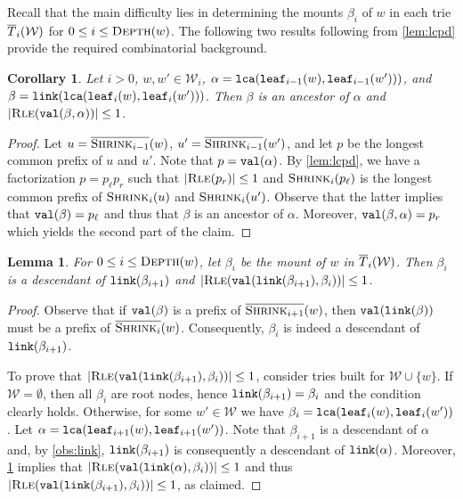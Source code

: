 \documentclass[a4paper]{article}
\newtheorem{lemma}[theorem]{Lemma}
\newtheorem{corollary}[theorem]{Corollary}
\theoremstyle{remark}
\newcommand{\depth}{\textsc{Depth}}
\newcommand{\rle}{\textsc{Rle}}
\newcommand{\shrink}[1]{\ensuremath{\textsc{Shrink}_{#1}}}
\newcommand{\cshrink}[1]{\ensuremath{\overline{\textsc{Shrink}_{#1}}}}
\newcommand{\coll}{\mathcal{W}}
\begin{document}
Recall that the main difficulty lies in determining the mounts $\beta_i$ of $w$ in each trie $\utrie_i(\coll)$
for $0\le i \le \depth(w)$.
The following two results following from \cref{lem:lcpd} provide the required combinatorial background.
\begin{corollary}\label{cor:lcpd}
Let $i>0$, $w,w'\in \coll_i$, $\alpha=\mathtt{lca}(\mathtt{leaf}_{i-1}(w),\mathtt{leaf}_{i-1}(w')))$,
and $\beta = \mathtt{link}(\mathtt{lca}(\mathtt{leaf}_{i}(w),\allowbreak \mathtt{leaf}_{i}(w')))$.
Then $\beta$ is an ancestor of $\alpha$ and $|\rle(\tval(\beta,\alpha))|\le 1$.
\end{corollary}
\begin{proof}
  Let $u=\cshrink{i-1}(w)$, $u'=\cshrink{i-1}(w')$,
and let $p$ be the longest common prefix of $u$ and $u'$.
Note that $p = \mathtt{val}(\alpha)$.
By \cref{lem:lcpd}, we have a factorization $p=p_\ell p_r$
such that $|\rle(p_r)|\le 1$ and $\shrink{i}(p_\ell)$ is the longest common prefix of $\shrink{i}(u)$ and $\shrink{i}(u')$.
Observe that the latter implies that $\mathtt{val}(\beta)=p_\ell$ and thus that $\beta$ is an ancestor of $\alpha$.
Moreover, $\mathtt{val}(\beta,\alpha)=p_r$ which yields the second part of the claim.
\end{proof}

\begin{lemma}\label{lem:inscorr}
For $0\le i\le \depth(w)$, let $\beta_i$ be the mount of $w$ in $\utrie_i(\coll)$.
Then $\beta_i$ is a descendant of $\mathtt{link}(\beta_{i+1})$ and $|\rle(\tval(\tlink(\beta_{i+1}),\beta_i))|\le 1$.
\end{lemma}
\begin{proof}
Observe that if $\mathtt{val}(\beta)$ is a prefix of $\cshrink{i+1}(w)$, then $\mathtt{val}(\mathtt{link}(\beta))$
must be a prefix of $\cshrink{i}(w)$. Consequently, $\beta_i$ is indeed a descendant of $\mathtt{link}(\beta_{i+1})$.

To prove that $|\rle(\tval(\tlink(\beta_{i+1}),\beta_i))|\le 1$, consider tries built for $\coll\cup \{w\}$.
If $\coll=\emptyset$, then all $\beta_i$ are root nodes, hence $\mathtt{link}(\beta_{i+1})=\beta_i$
and the condition clearly holds.
Otherwise, for some $w'\in \coll$ we have  $\beta_{i}=\mathtt{lca}(\mathtt{leaf}_{i}(w),\mathtt{leaf}_{i}(w'))$.
Let $\alpha = \mathtt{lca}(\mathtt{leaf}_{i+1}(w),\mathtt{leaf}_{i+1}(w'))$.
Note that $\beta_{i+1}$ is a descendant of $\alpha$ and, by \cref{obs:link}, $\mathtt{link}(\beta_{i+1})$ is consequently a descendant of $\mathtt{link}(\alpha)$.
Moreover, \cref{cor:lcpd} implies that $|\rle(\tval(\tlink(\alpha),\beta_i))|\le 1$
and thus $|\rle(\tval(\tlink(\beta_{i+1}),\beta_i))|\le 1$, as claimed.
\end{proof}
\end{document}
